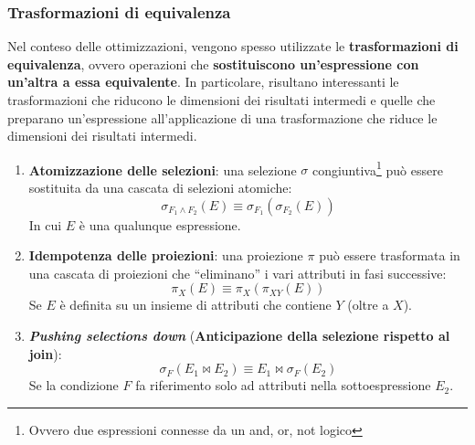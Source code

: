 \documentclass[a4paper]{article}
\newcommand{\dquotes}[1]{``#1''}
\begin{document}
	\subsubsection{Trasformazioni di equivalenza}
	
	Nel conteso delle ottimizzazioni, vengono spesso utilizzate le \textcolor{Red3}{\textbf{trasformazioni di equivalenza}}, ovvero operazioni che \textbf{sostituiscono un'espressione con un'altra a essa equivalente}. In particolare, risultano interessanti le trasformazioni che riducono le dimensioni dei risultati intermedi e quelle che preparano un'espressione all'applicazione di una trasformazione che riduce le dimensioni dei risultati intermedi.
	\begin{enumerate}[label=\Roman*.]
		\item \textcolor{Red3}{\textbf{Atomizzazione delle selezioni}}: una selezione $\sigma$ congiuntiva\footnote{Ovvero due espressioni connesse da un and, or, not logico} può essere sostituita da una cascata di selezioni atomiche:
		\begin{equation*}
			\sigma_{F_{1} \land F_{2}}\left(E\right) \equiv \sigma_{F_{1}}\left(\sigma_{F_{2}}\left(E\right)\right)
		\end{equation*}
		In cui $E$ è una qualunque espressione.
	
		\item \textcolor{Red3}{\textbf{Idempotenza delle proiezioni}}: una proiezione $\pi$ può essere trasformata in una cascata di proiezioni che \dquotes{eliminano} i vari attributi in fasi successive:
		\begin{equation*}
			\pi_{X}\left(E\right) \equiv \pi_{X}\left(\pi_{XY}\left(E\right)\right)
		\end{equation*}
		Se $E$ è definita su un insieme di attributi che contiene $Y$ (oltre a $X$).
	
		\item \textcolor{Red3}{\textbf{\emph{Pushing selections down}} (\textbf{Anticipazione della selezione rispetto al join})}:
		\begin{equation*}
			\sigma_{F}\left(E_{1} \Join E_{2}\right) \equiv E_{1} \Join \sigma_{F}\left(E_{2}\right)
		\end{equation*}
		Se la condizione $F$ fa riferimento solo ad attributi nella sottoespressione $E_{2}$.
	

\end{enumerate}
\end{document}

